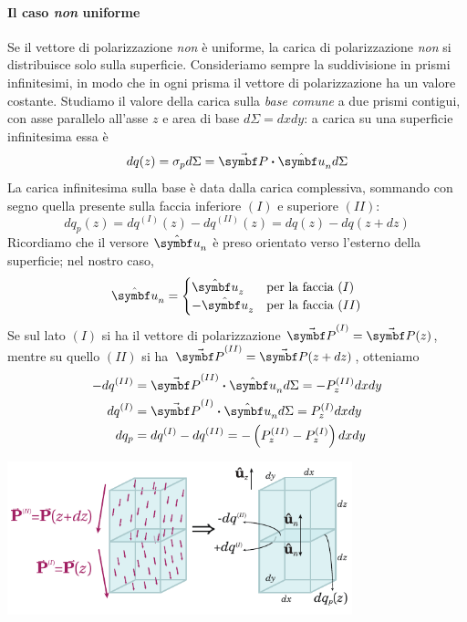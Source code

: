 \paragraph{Il caso \textit{non} uniforme}
Se il vettore di polarizzazione \textit{non} è uniforme, la carica di polarizzazione \textit{non} si distribuisce solo sulla superficie. Consideriamo sempre la suddivisione in prismi infinitesimi, in modo che in ogni prisma il vettore di polarizzazione ha un valore costante. Studiamo il valore della carica sulla \textit{base comune} a due prismi contigui, con asse parallelo all'asse $z$ e area di base $d\Sigma=dxdy$: a carica su una superficie infinitesima essa è
\begin{equation*}
	dq(z)=\sigma_pd\Sigma=\vba{P}\vdot \vbh{u}_nd\Sigma
\end{equation*}
La carica infinitesima sulla base è data dalla carica complessiva, sommando con segno quella presente sulla faccia inferiore $(I)$ e superiore $(II)$:
\begin{equation*}
	dq_{p}(z)=dq^{(I)}(z)-dq^{(II)}(z)=dq(z)-dq(z+dz)
\end{equation*}
Ricordiamo che il versore $\vbh{u}_n$ è preso orientato verso l'esterno della superficie; nel nostro caso,
\begin{equation*}
	\vbh{u}_n=\begin{cases}
		\vbh{u}_z&\text{per la faccia}\ (I)\\
		-\vbh{u}_z&\text{per la faccia}\ (II)\\
	\end{cases}
\end{equation*}
Se sul lato $(I)$ si ha il vettore di polarizzazione $\vba{P}^{(I)}=\vba{P}(z)$, mentre su quello $(II)$ si ha $\vba{P}^{(II)}=\vba{P}(z+dz)$, otteniamo
\begin{align*}
	-dq^{(II)}&=\vba{P}^{(II)}\vdot \vbh{u}_nd\Sigma=-P^{(II)}_z dxdy\\
	dq^{(I)}&=\vba{P}^{(I)}\vdot \vbh{u}_nd\Sigma=P^{(I)}_z dxdy\\
	dq_{p}&=dq^{(I)}-dq^{(II)}=-\left(P^{(II)}_z-P^{(I)}_z\right) dxdy
\end{align*}
\begin{center}
	\includegraphics[width=0.75\textwidth]{images/chp6/chp6caricapolari3.pdf}
\end{center}
